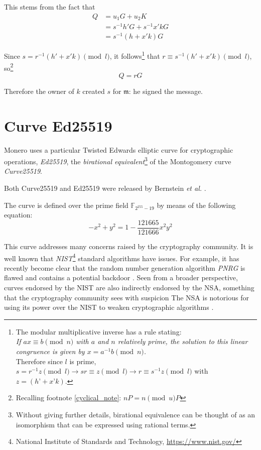 This stems from the fact that
\begin{align*}
Q &= u_1 G + u_2 K \\
  &= s^{-1} h' G + s^{ -1} x' k G \\
  &= s^{-1} (h + x' k) G
\end{align*}

Since \(s = r^{-1} (h' + x' k) \pmod{l} \), it follows\footnote{\label{inverse_rule_note}The modular multiplicative inverse has a rule stating:\\
{\em If $a x \equiv b \pmod{n}$ with $a$ and $n$ relatively prime, the solution to this linear congruence is given by $x = a^{-1} b \pmod{n}$.}\cite{wiki-modular-arithmetic}\\
Therefore since $l$ is prime, $s = r^{-1} z \pmod{l} \rightarrow s r \equiv z \pmod{l} \rightarrow r \equiv s^{-1}z \pmod{l}$ with $z = (h’ + x’ k)$.
}
that \(r \equiv s^{-1}(h' + x' k) \pmod{l}\), so\footnote{\label{recall1_note}Recalling footnote \ref{cyclical_note}: $n P = n \pmod{u} P$}
\[Q = r G\]

Therefore the owner of $k$ created $s$ for $\mathfrak{m}$: he signed the message.

\section{Curve Ed25519}
\label{Ed25519_section}

Monero uses a particular Twisted Edwards elliptic curve for cryptographic operations, {\em Ed25519}, the {\em birational equivalent}\footnote{\label{birational_note}Without giving further details, birational equivalence can be thought of as an isomorphism that can be expressed using rational terms.} 
of the Montogomery curve {\em Curve25519}.

Both Curve25519 and Ed25519 were released by Bernstein {\em et al.} \cite{Bernstein2008, Bernstein2012, cryptoeprint:2007:286}.

The curve is defined over the prime field \(\mathbb{F}_{2^{255} - 19} \) by means of the following equation:\\
\[ -x^2 + y^2 = 1 - \frac{121665}{121666} x^2 y^2 \]

This curve addresses many concerns raised by the cryptography community. It is well known that {\em NIST}\footnote{\label{NIST_note}National Institute of Standards and Technology, \url{https://www.nist.gov/}} 
standard algorithms have issues. For example, it has recently become clear that the random number generation algorithm {\em PNRG} is flawed and contains a potential backdoor \cite{hales2014nsa}. Seen from a broader perspective, curves endorsed by the NIST are also indirectly endorsed by the NSA, something that the cryptography community sees with suspicion The NSA is notorious for using its power over the NIST to weaken cryptographic algorithms \cite{NSA-NIST}.
\\

